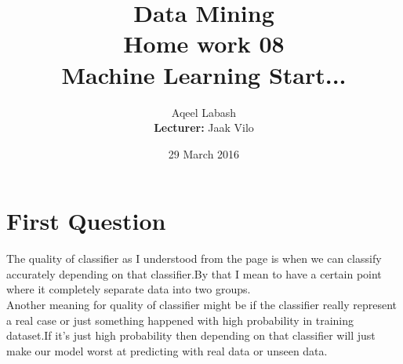 \documentclass{article}
\title{Data Mining\\
		Home work 08\\Machine Learning Start... }
\author{Aqeel Labash\\ \textbf{Lecturer:} Jaak Vilo}
\date{29 March 2016}
\begin{document}
	\maketitle
\section*{First Question}
The quality of classifier as I understood from the page is when we can classify accurately depending on that classifier.By that I mean to have a certain point where it completely separate data into two groups.\\ Another meaning for quality of classifier might be if the classifier really represent a real case or just something happened with high probability in training dataset.If it's just high probability then depending on that classifier will just make our model worst at predicting with real data or unseen data.\\
\end{document}
